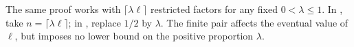 \begin{remark}
\label{rem:filtered-product-proportions}
The same proof works with $\lceil\lambda\ell\rceil$ restricted
factors for any fixed $0<\lambda\leq1$.  In
, take
$n=\lceil\lambda\ell\rceil$; in
, replace $1/2$ by
$\lambda$.  The finite pair affects the eventual value of $\ell$,
but imposes no lower bound on the positive proportion $\lambda$.
\end{remark}
